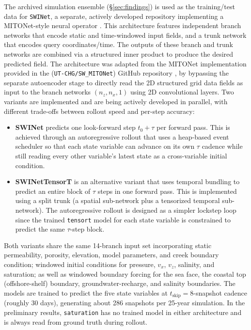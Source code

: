 The archived simulation ensemble (\S\ref{sec:findings}) is used as the training/test data for \texttt{SWINet}, a separate, actively developed repository implementing a MITONet-style neural operator \citep{riveracasillas2026mitonet}. This architecture features independent branch networks that encode static and
time-windowed input fields, and a trunk network that encodes query
coordinates/time. The outputs of these branch and trunk networks are combined via a structured inner product to produce the desired predicted field.
The architecture was adapted from the MITONet implementation provided in the  (\texttt{UT-CHG/SW\_MITONet}) GitHub repository \citep{dutta2026swmitonet},
by bypassing the separate autoencoder stage to directly read the 2D structured grid data fields as input to the branch networks $(n_z, n_x, 1)$ using 2D convolutional layers. Two variants are implemented and are being actively developed in parallel, with different trade-offs between rollout speed and per-step accuracy:

\begin{itemize}
  \item \textbf{SWINet} predicts one look-forward step $t_0 + \tau$ per
    forward pass. This is achieved through an autoregressive rollout that uses a heap-based event scheduler so that each state variable can advance on its own $\tau$ cadence while still reading every other variable's latest state as a cross-variable initial condition.
  \item \textbf{SWINetTensorT} is an alternative variant that uses temporal bundling to predict an entire block of $\tau$ steps in one forward pass. This is implemented using a split trunk (a spatial sub-network plus a tensorized temporal sub-network). The autoregressive rollout is designed as a simpler lockstep loop since the trained \texttt{tensort} model for each state variable is constrained to predict the same $\tau$-step block.
\end{itemize}

Both variants share the same 14-branch input set incorporating static permeability, porosity, elevation, model parameters, and creek boundary condition; windowed initial conditions for pressure, $v_x$, $v_z$, salinity, and
saturation; as well as windowed boundary forcing for the sea face, the coastal top (offshore-shelf) boundary, groundwater-recharge, and salinity boundaries. The models are trained to predict the five state variables at $t_{\mathrm{skip}} = 8$-snapshot cadence (roughly 30 days), generating about 286
snapshots per 25-year simulation. In the preliminary results, \texttt{saturation} has no trained model in either architecture and is always read from ground truth during rollout. 

